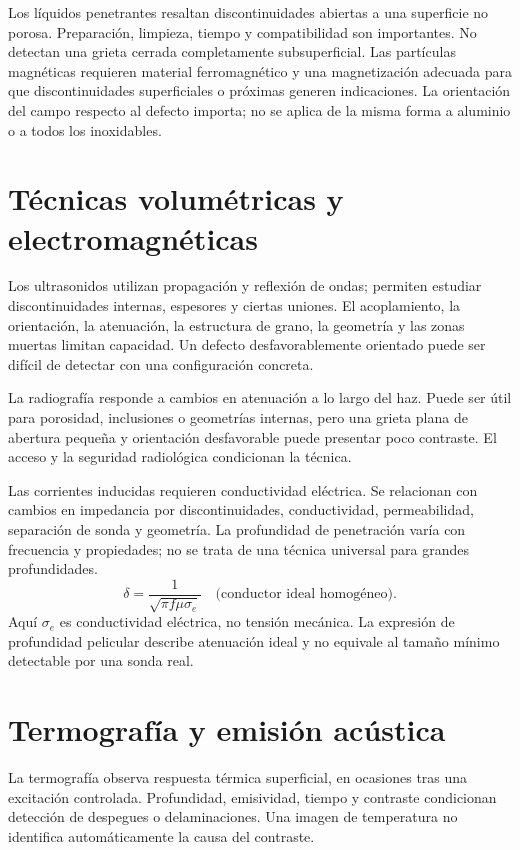 Los líquidos penetrantes resaltan discontinuidades abiertas a una superficie no porosa. Preparación, limpieza, tiempo y compatibilidad son importantes. No detectan una grieta cerrada completamente subsuperficial. Las partículas magnéticas requieren material ferromagnético y una magnetización adecuada para que discontinuidades superficiales o próximas generen indicaciones. La orientación del campo respecto al defecto importa; no se aplica de la misma forma a aluminio o a todos los inoxidables.
\section{Técnicas volumétricas y electromagnéticas}
Los ultrasonidos utilizan propagación y reflexión de ondas; permiten estudiar discontinuidades internas, espesores y ciertas uniones. El acoplamiento, la orientación, la atenuación, la estructura de grano, la geometría y las zonas muertas limitan capacidad. Un defecto desfavorablemente orientado puede ser difícil de detectar con una configuración concreta.

La radiografía responde a cambios en atenuación a lo largo del haz. Puede ser útil para porosidad, inclusiones o geometrías internas, pero una grieta plana de abertura pequeña y orientación desfavorable puede presentar poco contraste. El acceso y la seguridad radiológica condicionan la técnica.

Las corrientes inducidas requieren conductividad eléctrica. Se relacionan con cambios en impedancia por discontinuidades, conductividad, permeabilidad, separación de sonda y geometría. La profundidad de penetración varía con frecuencia y propiedades; no se trata de una técnica universal para grandes profundidades.
\begin{equation}\delta=\frac1{\sqrt{\pi f\mu\sigma_e}}\quad\text{(conductor ideal homogéneo).}\label{eq:skin}\end{equation}
Aquí $\sigma_e$ es conductividad eléctrica, no tensión mecánica. La expresión de profundidad pelicular describe atenuación ideal y no equivale al tamaño mínimo detectable por una sonda real.
\section{Termografía y emisión acústica}
La termografía observa respuesta térmica superficial, en ocasiones tras una excitación controlada. Profundidad, emisividad, tiempo y contraste condicionan detección de despegues o delaminaciones. Una imagen de temperatura no identifica automáticamente la causa del contraste.

